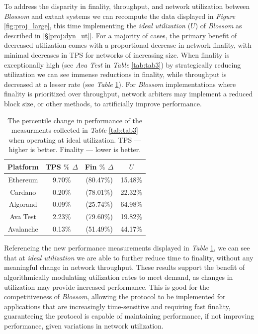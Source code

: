 To address the disparity in finality, throughput, and network utilization between \textit{Blossom} and extant systems we can recompute the data displayed in \textit{Figure} \ref{fig:proj_large}, this time implementing the \textit{ideal utilization} ($U$) of \textit{Blossom} as described in \textit{} [\S\ref{proj:dyn_ut}]. For a majority of cases, the primary benefit of decreased utilization comes with a proportional decrease in network finality, with minimal decreases in TPS for networks of increasing size. When finality is exceptionally high (see \textit{Ava Test} in \textit{Table} \ref{tab:tab3}) by strategically reducing utilization we can see immense reductions in finality, while throughput is decreased at a lesser rate (see \textit{Table} \ref{tab:tab4}). For \textit{Blossom} implementations where finality is prioritized over throughput, network arbiters may implement a reduced block size, or other methods, to artificially improve performance.

\begin{table}[!h]
\centering
    \begin{tabular}{cccc}
     \hline
     \textbf{Platform} &TPS $\%$ $\Delta$  &Fin $\%$ $\Delta$ &$U$\\
     \hline
    Ethereum &9.70$\%$ &(80.47$\%$)& 15.48$\%$ \\
    Cardano &0.20$\%$ &(78.01$\%$)& 22.32$\%$ \\
    Algorand &0.09$\%$ &(25.74$\%$)& 64.98$\%$ \\
    Ava Test &2.23$\%$ &(79.60$\%$)& 19.82$\%$ \\
    Avalanche &0.13$\%$ &(51.49$\%$)& 44.17$\%$ \\
     \hline
    \end{tabular}
    \caption{The percentile change in performance of the measurments collected in \textit{Table} \ref{tab:tab3} when operating at ideal utilization. TPS  — higher is better. Finality — lower is better.}
    \label{tab:tab4}
\end{table}

Referencing the new performance measurements displayed in \textit{Table} \ref{tab:tab4}, we can see that at \textit{ideal utilization} we are able to further reduce time to finality, without any meaningful change in network throughput. These results support the benefit of algorithmically modulating utilization rates to meet demand, as changes in utilization may provide increased performance. This is good for the competitiveness of \textit{Blossom}, allowing the protocol to be implemented for applications that are increasingly time-sensitive and requiring fast finality, guaranteeing the protocol is capable of maintaining performance, if not improving performance, given variations in network utilization.
